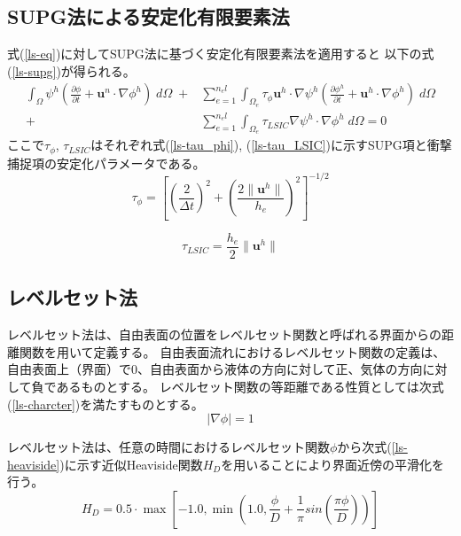 \subsection{SUPG法による安定化有限要素法}
式(\ref{ls-eq})に対してSUPG法に基づく安定化有限要素法を適用すると
以下の式(\ref{ls-supg})が得られる。
\begin{equation}
\label{ls-supg}
		\begin{split}
		\int_{\Omega} \psi^{h}\left( \frac{\partial \phi}{\partial t} + \bm{u}^{n} \cdot \nabla \phi^{h} \right) \; d\Omega \;+& 
		\sum^{n_el}_{e=1} \int_{\Omega_{e}} \tau_{\phi} \bm{u}^{h} \cdot \nabla \psi^{h} \left( \frac{\partial \phi^{h}}{\partial t} + \bm{u}^{h} \cdot \nabla \phi^{h} \right) \; d\Omega \\
		+& \sum^{n_el}_{e=1} \int_{\Omega_{e}} \tau_{LSIC} \nabla \psi^{h} \cdot \nabla \phi^{h} \; d\Omega = 0
	\end{split}
\end{equation}
ここで$\tau_\phi$, $\tau_{LSIC}$はそれぞれ式(\ref{ls-tau_phi}), (\ref{ls-tau_LSIC})に示すSUPG項と衝撃捕捉項の安定化パラメータである。
\begin{equation}
\label{ls-tau_phi}
	\tau_{\phi} = \left[ \left(\frac{2}{\Delta t} \right)^2 + \left(\frac{2 \| \bm{u}^{h} \|}{h_{e}} \right)^2 \right]^{-1/2}
\end{equation}

\begin{equation}
\label{ls-tau_LSIC}
	\tau_{LSIC} = \frac{h_{e}}{2} \| \bm{u}^{h} \|
\end{equation}

\subsection{レベルセット法}
レベルセット法は、自由表面の位置をレベルセット関数と呼ばれる界面からの距離関数を用いて定義する。
自由表面流れにおけるレベルセット関数の定義は、自由表面上（界面）で0、自由表面から液体の方向に対して正、気体の方向に対して負であるものとする。
レベルセット関数の等距離である性質としては次式(\ref{ls-charcter})を満たすものとする。
\begin{equation}
\label{ls-charcter}
	| \nabla \phi | = 1
\end{equation}

レベルセット法は、任意の時間におけるレベルセット関数$\phi$から次式(\ref{ls-heaviside})に示す近似Heaviside関数$H_{D}$を用いることにより界面近傍の平滑化を行う。
\begin{equation}
\label{ls-heaviside}
	H_{D} = 0.5 \cdot \max \left[-1.0, \min \left(1.0, \frac{\phi}{D} + \frac{1}{\pi} sin\left(\frac{\pi \phi}{D}\right)\right) \right]
\end{equation}

